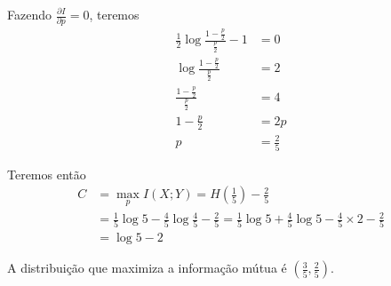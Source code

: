 \begin{questions}
\begin{solution}
Fazendo $\frac{\partial I}{\partial p} = 0$, teremos
\begin{align}
\frac{1}{2} \log \frac{1 - \frac{p}{2}}{\frac{p}{2}} - 1 &= 0 \\ \nonumber 
\log \frac{1 - \frac{p}{2}}{\frac{p}{2}} &= 2 \\ \nonumber 
\frac{1 - \frac{p}{2}}{\frac{p}{2}} &= 4 \\ \nonumber 
1 - \frac{p}{2} &= 2 p \\ \nonumber
p &= \frac{2}{5}  
\end{align}


Teremos então
\begin{align}
C &= \max_p I(X;Y) = H\left(\frac{1}{5}\right) - \frac{2}{5} \nonumber \\
 &= \frac{1}{5} \log 5 -\frac{4}{5} \log \frac{4}{5} - \frac{2}{5} = \frac{1}{5} \log 5 + \frac{4}{5} \log 5 -\frac{4}{5} \times 2 - \frac{2}{5} \nonumber \\
 &= \log 5 - 2
\end{align}

A distribuição que maximiza a informação mútua é $\left( \frac{3}{5} , \frac{2}{5}\right)$.



\end{solution}
\end{questions}
